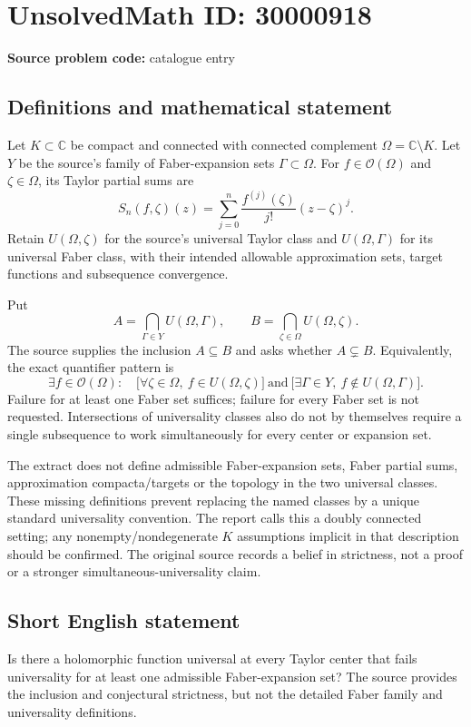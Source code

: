 \documentclass[11pt]{article}
\newcommand{\C}{\mathbb{C}}
\begin{document}
\section*{UnsolvedMath ID: 30000918}
\textbf{Source problem code:} catalogue entry
\subsection{Definitions and mathematical statement}
Let $K\subset\C$ be compact and connected with connected complement $\Omega=\C\setminus K$. Let $Y$ be the source's family of Faber-expansion sets $\Gamma\subset\Omega$. For $f\in\mathcal O(\Omega)$ and $\zeta\in\Omega$, its Taylor partial sums are
\[
S_n(f,\zeta)(z)=\sum_{j=0}^{n}\frac{f^{(j)}(\zeta)}{j!}(z-\zeta)^j.
\]
Retain $U(\Omega,\zeta)$ for the source's universal Taylor class and $U(\Omega,\Gamma)$ for its universal Faber class, with their intended allowable approximation sets, target functions and subsequence convergence.

Put
\[
A=\bigcap_{\Gamma\in Y}U(\Omega,\Gamma),\qquad
B=\bigcap_{\zeta\in\Omega}U(\Omega,\zeta).
\]
The source supplies the inclusion $A\subseteq B$ and asks whether $A\subsetneq B$. Equivalently, the exact quantifier pattern is
\[
\exists f\in\mathcal O(\Omega):\quad
\bigl[\forall\zeta\in\Omega,\ f\in U(\Omega,\zeta)\bigr]
\ \text{and}\
\bigl[\exists\Gamma\in Y,\ f\notin U(\Omega,\Gamma)\bigr].
\]
Failure for at least one Faber set suffices; failure for every Faber set is not requested. Intersections of universality classes also do not by themselves require a single subsequence to work simultaneously for every center or expansion set.

The extract does not define admissible Faber-expansion sets, Faber partial sums, approximation compacta/targets or the topology in the two universal classes. These missing definitions prevent replacing the named classes by a unique standard universality convention. The report calls this a doubly connected setting; any nonempty/nondegenerate $K$ assumptions implicit in that description should be confirmed. The original source records a belief in strictness, not a proof or a stronger simultaneous-universality claim.
\subsection{Short English statement}
Is there a holomorphic function universal at every Taylor center that fails universality for at least one admissible Faber-expansion set? The source provides the inclusion and conjectural strictness, but not the detailed Faber family and universality definitions.
\end{document}

